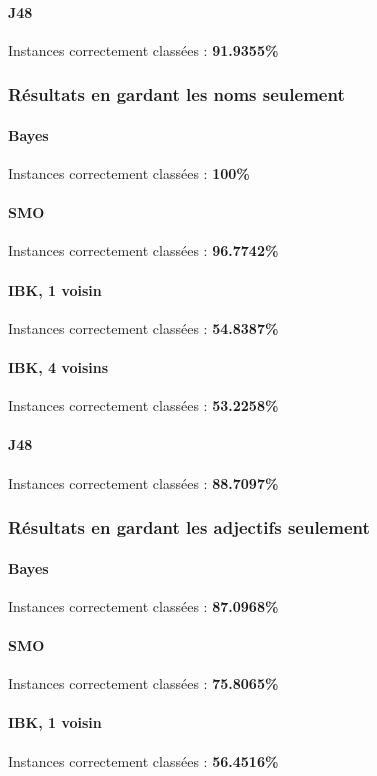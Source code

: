 \documentclass[a4paper,11pt]{article}
\begin{document}
\paragraph{J48} Instances correctement classées : \textbf{91.9355\%}

\subsubsection{Résultats en gardant les noms seulement}
\paragraph{Bayes} Instances correctement classées : \textbf{100\%}
\paragraph{SMO} Instances correctement classées : \textbf{96.7742\%}
\paragraph{IBK, 1 voisin} Instances correctement classées : \textbf{54.8387\%}
\paragraph{IBK, 4 voisins} Instances correctement classées : \textbf{53.2258\%}
\paragraph{J48} Instances correctement classées : \textbf{88.7097\%}

\subsubsection{Résultats en gardant les adjectifs seulement}
\paragraph{Bayes} Instances correctement classées : \textbf{87.0968\%}
\paragraph{SMO} Instances correctement classées : \textbf{75.8065\%}
\paragraph{IBK, 1 voisin} Instances correctement classées : \textbf{56.4516\%}
\end{document}
